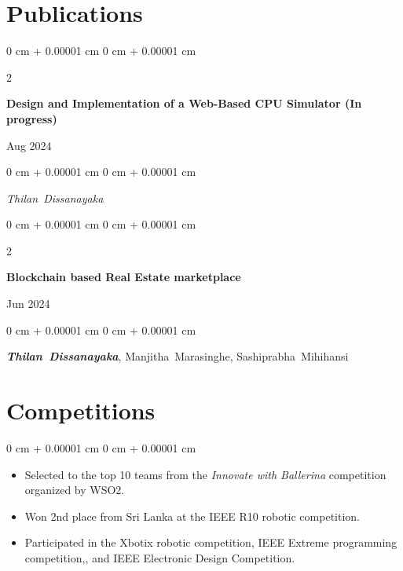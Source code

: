 \documentclass[10pt, letterpaper]{article}
\newenvironment{highlights}{
    \begin{itemize}[
        topsep=0.10 cm,
        parsep=0.10 cm,
        partopsep=0pt,
        itemsep=0pt,
        leftmargin=0 cm + 10pt
    ]
}{
    \end{itemize}
} %
\newenvironment{onecolentry}{
    \begin{adjustwidth}{
        0 cm + 0.00001 cm
    }{
        0 cm + 0.00001 cm
    }
}{
    \end{adjustwidth}
} %
\newenvironment{twocolentry}[2][]{
    \onecolentry
    \def\secondColumn{#2}
    \setcolumnwidth{\fill, 4.5 cm}
    \begin{paracol}{2}
}{
    \switchcolumn \raggedleft \secondColumn
    \end{paracol}
    \endonecolentry
} %
\begin{document}
    
    \section{Publications}    
        \begin{samepage}
            \begin{twocolentry}{
                Aug 2024
            }
                \textbf{Design and Implementation of a Web-Based CPU Simulator (In progress)}
            \end{twocolentry}

            \vspace{0.10 cm}
            
            \begin{onecolentry}
                \mbox{\textit{Thilan Dissanayaka}}

                \vspace{0.10 cm}
                
        \end{onecolentry}

        
        \end{samepage}

                        \vspace{0.3 cm}

                \begin{samepage}
            \begin{twocolentry}{
                Jun 2024
            }
                \textbf{Blockchain based Real Estate marketplace}
            \end{twocolentry}

            \vspace{0.10 cm}
            
            \begin{onecolentry}
                \mbox{\textbf{\textit{Thilan Dissanayaka}}}, \mbox{Manjitha Marasinghe}, \mbox{Sashiprabha Mihihansi}

        \end{onecolentry}
        \end{samepage}
    
    \section{Competitions}
        \begin{onecolentry}
            \begin{highlights}
            \item Selected to the top 10 teams from the \textit{Innovate with Ballerina}  competition organized by WSO2.
            \item Won 2nd place from Sri Lanka at the IEEE R10 robotic competition.
            \item Participated in the Xbotix robotic competition, IEEE Extreme programming competition,, and IEEE Electronic Design Competition.
            \end{highlights}
        \end{onecolentry}
\end{document}
